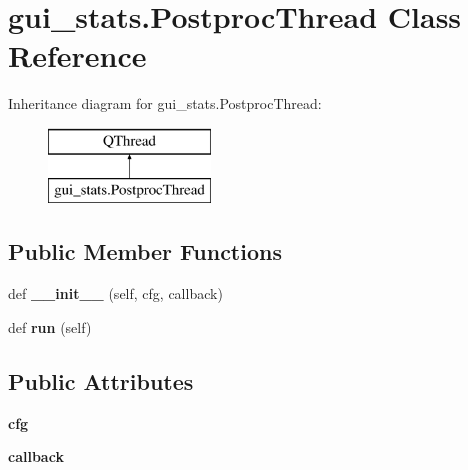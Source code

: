 \hypertarget{classgui__stats_1_1_postproc_thread}{}\section{gui\+\_\+stats.\+Postproc\+Thread Class Reference}
\label{classgui__stats_1_1_postproc_thread}
Inheritance diagram for gui\+\_\+stats.\+Postproc\+Thread\+:\begin{figure}[H]
\begin{center}
\leavevmode
\includegraphics[height=2.000000cm]{d5/d1d/classgui__stats_1_1_postproc_thread}
\end{center}
\end{figure}
\subsection*{Public Member Functions}
\begin{DoxyCompactItemize}
\item 
\mbox{\label{classgui__stats_1_1_postproc_thread_aab68c4dca7597bfc52dd3a4c886d63b2}} 
def {\bfseries \+\_\+\+\_\+init\+\_\+\+\_\+} (self, cfg, callback)
\item 
\mbox{\label{classgui__stats_1_1_postproc_thread_a6fea4df3562550a14649c378c0b7d4da}} 
def {\bfseries run} (self)
\end{DoxyCompactItemize}
\subsection*{Public Attributes}
\begin{DoxyCompactItemize}
\item 
\mbox{\label{classgui__stats_1_1_postproc_thread_a87ebb7a08e91ff8ff1b79f23001d06aa}} 
{\bfseries cfg}
\item 
\mbox{\label{classgui__stats_1_1_postproc_thread_acae8bf94632196ccbb2bf0be36b7870c}} 
{\bfseries callback}
\end{DoxyCompactItemize}
